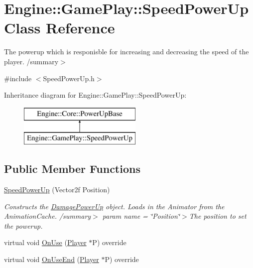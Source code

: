 \hypertarget{class_engine_1_1_game_play_1_1_speed_power_up}{}\section{Engine\+:\+:Game\+Play\+:\+:Speed\+Power\+Up Class Reference}
\label{class_engine_1_1_game_play_1_1_speed_power_up}


The powerup which is responisble for increasing and decreasing the speed of the player. /summary$>$  




{\ttfamily \#include $<$Speed\+Power\+Up.\+h$>$}

Inheritance diagram for Engine\+:\+:Game\+Play\+:\+:Speed\+Power\+Up\+:\begin{figure}[H]
\begin{center}
\leavevmode
\includegraphics[height=2.000000cm]{class_engine_1_1_game_play_1_1_speed_power_up}
\end{center}
\end{figure}
\subsection*{Public Member Functions}
\begin{DoxyCompactItemize}
\item 
\hyperlink{class_engine_1_1_game_play_1_1_speed_power_up_ac619eef8e87815cc58a256ddde54d049}{Speed\+Power\+Up} (Vector2f Position)
\begin{DoxyCompactList}\small\item\em Constructs the \hyperlink{class_engine_1_1_game_play_1_1_damage_power_up}{Damage\+Power\+Up} object. Loads in the Animator from the Animation\+Cache. /summary$>$ param name = \char`\"{}\+Position\char`\"{}$>$The position to set the powerup.\end{DoxyCompactList}\item 
virtual void \hyperlink{class_engine_1_1_game_play_1_1_speed_power_up_a0901961fb01656a2b81ccf846e370e31}{On\+Use} (\hyperlink{class_engine_1_1_game_play_1_1_player}{Player} $\ast$P) override
\item 
virtual void \hyperlink{class_engine_1_1_game_play_1_1_speed_power_up_ad305e70493c2b51a87e58d58cea73521}{On\+Use\+End} (\hyperlink{class_engine_1_1_game_play_1_1_player}{Player} $\ast$P) override
\end{DoxyCompactItemize}
